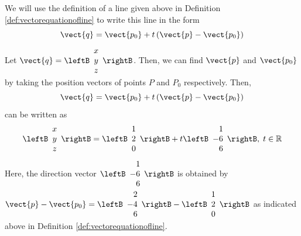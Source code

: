 \begin{solution}
We will use the definition of a line given above in Definition \ref{def:vectorequationofline} to write
this line in the form 
\begin{equation*}
\vect{q}=\vect{p_0}+t\left( \vect{p}-\vect{p_0}\right)
\end{equation*}
Let $\vect{q} = 
\leftB
\begin{array}{c}
x \\
y \\
z
\end{array}
\rightB
$. Then, we can find $\vect{p}$ and $\vect{p_0}$ by taking the position vectors of points $P$ and $P_0$ 
respectively. 
Then, 
\begin{equation*}
\vect{q}=\vect{p_0}+t\left( \vect{p}-\vect{p_0}\right)
\end{equation*}
can be written as
\begin{equation*}
\leftB
\begin{array}{c}
x \\
y \\
z \\
\end{array}
\rightB
 =
\leftB
\begin{array}{c}
1 \\
2 \\
0
\end{array}
\rightB
+
t
\leftB
\begin{array}{r}
 1 \\
-6 \\
6  
\end{array}
\rightB,
\;t\in
\mathbb{R}
\end{equation*}
Here, the direction vector $
\leftB
\begin{array}{r}
1 \\
-6 \\
6 
\end{array}
\rightB
$
is obtained by $
\vect{p} - \vect{p_0} = 
\leftB
\begin{array}{r}
2 \\
-4 \\
6
\end{array}
\rightB
-
\leftB
\begin{array}{r}
1 \\
2 \\
0
\end{array}
\rightB
$
as indicated above in Definition \ref{def:vectorequationofline}.
\end{solution} 

